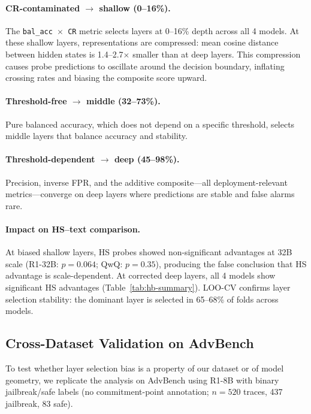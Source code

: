 \documentclass[11pt]{article}
\begin{document}
\paragraph{CR-contaminated $\to$ shallow (0--16\%).}
The \texttt{bal\_acc $\times$ CR} metric selects layers at 0--16\% depth across all 4 models.
At these shallow layers, representations are compressed: mean cosine distance between hidden states is 1.4--2.7$\times$ smaller than at deep layers.
This compression causes probe predictions to oscillate around the decision boundary, inflating crossing rates and biasing the composite score upward.

\paragraph{Threshold-free $\to$ middle (32--73\%).}
Pure balanced accuracy, which does not depend on a specific threshold, selects middle layers that balance accuracy and stability.

\paragraph{Threshold-dependent $\to$ deep (45--98\%).}
Precision, inverse FPR, and the additive composite---all deployment-relevant metrics---converge on deep layers where predictions are stable and false alarms rare.

\paragraph{Impact on HS--text comparison.}
At biased shallow layers, HS probes showed non-significant advantages at 32B scale (R1-32B: $p{=}0.064$; QwQ: $p{=}0.35$), producing the false conclusion that HS advantage is scale-dependent.
At corrected deep layers, all 4 models show significant HS advantages (Table~\ref{tab:hb-summary}).
LOO-CV confirms layer selection stability: the dominant layer is selected in 65--68\% of folds across models.


\subsection{Cross-Dataset Validation on AdvBench}
\label{sec:advbench}

To test whether layer selection bias is a property of our dataset or of model geometry, we replicate the analysis on AdvBench \cite{zou2023advbench} using R1-8B with binary jailbreak/safe labels (no commitment-point annotation; $n{=}520$ traces, 437 jailbreak, 83 safe).
\end{document}
